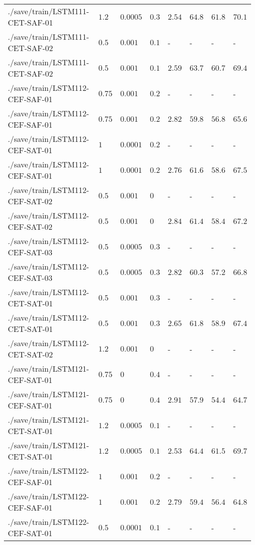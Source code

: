 \begin{table}[tbp]
\begin{tabular}{llllllll}
./save/train/LSTM111-CET-SAF-01 & $1.2$ & $0.0005$ & $0.3$ & $2.54$ & $64.8$ & $61.8$ & $70.1$ \\
./save/train/LSTM111-CET-SAF-02 & $0.5$ & $0.001$ & $0.1$ & - & - & - & - \\
./save/train/LSTM111-CET-SAF-02 & $0.5$ & $0.001$ & $0.1$ & $2.59$ & $63.7$ & $60.7$ & $69.4$ \\
./save/train/LSTM112-CEF-SAF-01 & $0.75$ & $0.001$ & $0.2$ & - & - & - & - \\
./save/train/LSTM112-CEF-SAF-01 & $0.75$ & $0.001$ & $0.2$ & $2.82$ & $59.8$ & $56.8$ & $65.6$ \\
./save/train/LSTM112-CEF-SAT-01 & $1$ & $0.0001$ & $0.2$ & - & - & - & - \\
./save/train/LSTM112-CEF-SAT-01 & $1$ & $0.0001$ & $0.2$ & $2.76$ & $61.6$ & $58.6$ & $67.5$ \\
./save/train/LSTM112-CEF-SAT-02 & $0.5$ & $0.001$ & $0$ & - & - & - & - \\
./save/train/LSTM112-CEF-SAT-02 & $0.5$ & $0.001$ & $0$ & $2.84$ & $61.4$ & $58.4$ & $67.2$ \\
./save/train/LSTM112-CEF-SAT-03 & $0.5$ & $0.0005$ & $0.3$ & - & - & - & - \\
./save/train/LSTM112-CEF-SAT-03 & $0.5$ & $0.0005$ & $0.3$ & $2.82$ & $60.3$ & $57.2$ & $66.8$ \\
./save/train/LSTM112-CET-SAT-01 & $0.5$ & $0.001$ & $0.3$ & - & - & - & - \\
./save/train/LSTM112-CET-SAT-01 & $0.5$ & $0.001$ & $0.3$ & $2.65$ & $61.8$ & $58.9$ & $67.4$ \\
./save/train/LSTM112-CET-SAT-02 & $1.2$ & $0.001$ & $0$ & - & - & - & - \\
./save/train/LSTM121-CEF-SAT-01 & $0.75$ & $0$ & $0.4$ & - & - & - & - \\
./save/train/LSTM121-CEF-SAT-01 & $0.75$ & $0$ & $0.4$ & $2.91$ & $57.9$ & $54.4$ & $64.7$ \\
./save/train/LSTM121-CET-SAT-01 & $1.2$ & $0.0005$ & $0.1$ & - & - & - & - \\
./save/train/LSTM121-CET-SAT-01 & $1.2$ & $0.0005$ & $0.1$ & $2.53$ & $64.4$ & $61.5$ & $69.7$ \\
./save/train/LSTM122-CEF-SAF-01 & $1$ & $0.001$ & $0.2$ & - & - & - & - \\
./save/train/LSTM122-CEF-SAF-01 & $1$ & $0.001$ & $0.2$ & $2.79$ & $59.4$ & $56.4$ & $64.8$ \\
./save/train/LSTM122-CEF-SAT-01 & $0.5$ & $0.0001$ & $0.1$ & - & - & - & - \\

\end{tabular}
\end{table}
